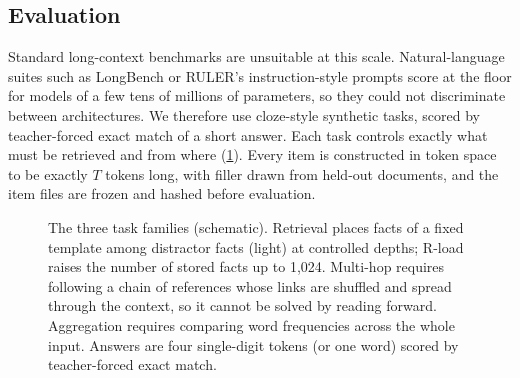 \documentclass[10pt,a4paper]{article}
\begin{document}
\subsection{Evaluation}\label{sec:eval}
Standard long-context benchmarks are unsuitable at this scale. Natural-language suites such as
LongBench or RULER's instruction-style prompts \citep{hsieh2024ruler} score at the floor for models
of a few tens of millions of parameters, so they could not discriminate between architectures. We
therefore use cloze-style synthetic tasks, scored by teacher-forced exact match of a short answer.
Each task controls exactly what must be retrieved and from where (\cref{fig:items}). Every item is
constructed in token space to be exactly $T$ tokens long, with filler drawn from held-out documents,
and the item files are frozen and hashed before evaluation.

\begin{figure}[t]
\centering
{}
\caption{The three task families (schematic). Retrieval places facts of a fixed template among
distractor facts (light) at controlled depths; R-load raises the number of stored facts up to 1,024.
Multi-hop requires following a chain of references whose links are shuffled and spread through the
context, so it cannot be solved by reading forward. Aggregation requires comparing word frequencies
across the whole input. Answers are four single-digit tokens (or one word) scored by teacher-forced
exact match.}
\label{fig:items}
\end{figure}
\end{document}
